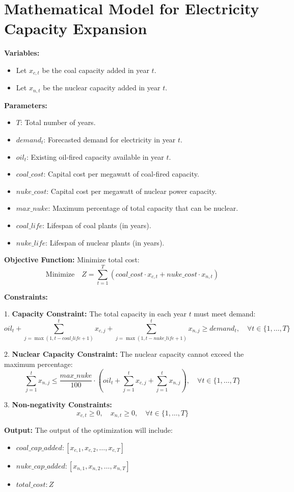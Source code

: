 \documentclass{article}
\begin{document}
\section*{Mathematical Model for Electricity Capacity Expansion}

\textbf{Variables:}
\begin{itemize}
    \item Let \( x_{c,t} \) be the coal capacity added in year \( t \).
    \item Let \( x_{n,t} \) be the nuclear capacity added in year \( t \).
\end{itemize}

\textbf{Parameters:}
\begin{itemize}
    \item \( T \): Total number of years.
    \item \( demand_t \): Forecasted demand for electricity in year \( t \).
    \item \( oil_t \): Existing oil-fired capacity available in year \( t \).
    \item \( coal\_cost \): Capital cost per megawatt of coal-fired capacity.
    \item \( nuke\_cost \): Capital cost per megawatt of nuclear power capacity.
    \item \( max\_nuke \): Maximum percentage of total capacity that can be nuclear.
    \item \( coal\_life \): Lifespan of coal plants (in years).
    \item \( nuke\_life \): Lifespan of nuclear plants (in years).
\end{itemize}

\textbf{Objective Function:}
Minimize total cost:
\[
\text{Minimize} \quad Z = \sum_{t=1}^{T} (coal\_cost \cdot x_{c,t} + nuke\_cost \cdot x_{n,t})
\]

\textbf{Constraints:}

1. \textbf{Capacity Constraint:}
   The total capacity in each year \( t \) must meet demand:
   \[
   oil_t + \sum_{j=\max(1, t-coal\_life+1)}^{t} x_{c,j} + \sum_{j=\max(1, t-nuke\_life+1)}^{t} x_{n,j} \geq demand_t, \quad \forall t \in \{1, \ldots, T\}
   \]

2. \textbf{Nuclear Capacity Constraint:}
   The nuclear capacity cannot exceed the maximum percentage:
   \[
   \sum_{j=1}^{t} x_{n,j} \leq \frac{max\_nuke}{100} \cdot \left( oil_t + \sum_{j=1}^{t} x_{c,j} + \sum_{j=1}^{t} x_{n,j} \right), \quad \forall t \in \{1, \ldots, T\}
   \]

3. \textbf{Non-negativity Constraints:}
   \[
   x_{c,t} \geq 0, \quad x_{n,t} \geq 0, \quad \forall t \in \{1, \ldots, T\}
   \]

\textbf{Output:}
The output of the optimization will include:
\begin{itemize}
    \item \( coal\_cap\_added: [x_{c,1}, x_{c,2}, \ldots, x_{c,T}] \)
    \item \( nuke\_cap\_added: [x_{n,1}, x_{n,2}, \ldots, x_{n,T}] \)
    \item \( total\_cost: Z \)
\end{itemize}
\end{document}
